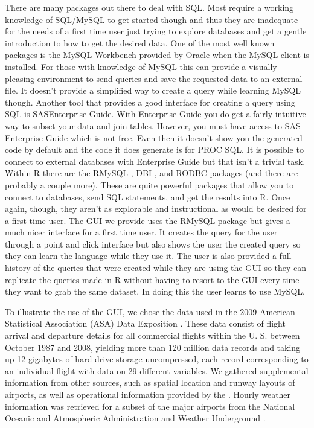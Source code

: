 \documentclass[11pt]{tise_style}
\begin{document}
There are many packages out there to deal with SQL.  Most require a working knowledge of SQL/MySQL to get started though and thus they are inadequate for the needs of a first time user just trying to explore databases and get a gentle introduction to how to get the desired data.  One of the most well known packages is the MySQL Workbench \citep{mysqlworkbench} provided by Oracle when the MySQL client is installed.  For those with knowledge of MySQL this can provide a visually pleasing environment to send queries and save the requested data to an external file.  It doesn't provide a simplified way to create a query while learning MySQL though.  Another tool that provides a good interface for creating a query using SQL is SAS\textregistered Enterprise Guide\textregistered  \citep{saseg}.  With Enterprise Guide you do get a fairly intuitive way to subset your data and join tables.  However, you must have access to SAS Enterprise Guide which is not free.  Even then it doesn't show you the generated code by default and the code it does generate is for PROC SQL.  It is possible to connect to external databases with Enterprise Guide but that isn't a trivial task.  Within R there are the RMySQL \citep{rmysql}, DBI \citep{dbi}, and RODBC \citep{rodbc} packages (and there are probably a couple more).  These are quite powerful packages that allow you to connect to databases, send SQL statements, and get the results into R.  Once again, though, they aren't as explorable and instructional as would be desired for a first time user.  The GUI we provide uses the RMySQL package but gives a much nicer interface for a first time user.  It creates the query for the user through a point and click interface but also shows the user the created query so they can learn the language while they use it.  The user is also provided a full history of the queries that were created while they are using the GUI so they can replicate the queries made in R without having to resort to the GUI every time they want to grab the same dataset.  In doing this the user learns to use MySQL.

To illustrate the use of the GUI, we chose the data used in the 2009 American Statistical Association (ASA) Data Exposition \citep{dataexpo, dataexpourl}. These data consist of flight arrival and departure details for all commercial flights within the U.\! S.\! between October 1987 and 2008, yielding more than 120 million data records and taking up 12 gigabytes of hard drive storage uncompressed, each record corresponding to an individual flight with data on 29 different variables. 
We gathered supplemental information from other sources, such as spatial location and runway layouts of airports, as well as operational information provided by the \citet{faa}. Hourly weather information was retrieved for a subset of the major airports from the National Oceanic and Atmospheric Administration \citep{noaa} and Weather Underground \citep{wunderground}. 
\end{document}
